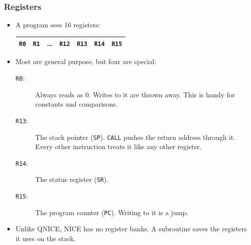 \documentclass{beamer}
\newcommand{\code}[1]{\texttt{#1}}
\begin{document}
%
   \begin{frame}
    \frametitle{Registers}
    \begin{itemize}
     \item A program sees 16 registers:
      \begin{center}
       \begin{tabular}{|c|c|c|c|c|c|c|}
        \hline
         \code{R0}&\code{R1}&\dots&\code{R12}&\code{R13}&\code{R14}&\code{R15}\\
        \hline
       \end{tabular}
      \end{center}
     \item Most are general purpose, but four are special:
      \begin{description}
       \item [\code{R0}:] Always reads as 0. Writes to it are thrown
        away. This is handy for constants and comparisons.
       \item [\code{R13}:] The stack pointer (\code{SP}). \code{CALL}
        pushes the return address through it. Every other instruction
        treats it like any other register.
       \item [\code{R14}:] The status register (\code{SR}).
       \item [\code{R15}:] The program counter (\code{PC}). Writing to it
        is a jump.
      \end{description}
     \item Unlike QNICE, NICE has no register banks. A subroutine saves
      the registers it uses on the stack.
    \end{itemize}
   \end{frame}
%
\end{document}
